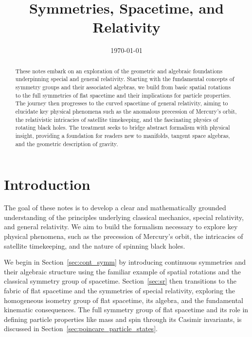 \documentclass{amsart}
\theoremstyle{definition}
\theoremstyle{remark}
\begin{document}
\title{Symmetries, Spacetime, and Relativity}
\author{}
\date{\today}

\begin{abstract}
  These notes embark on an exploration of the geometric and algebraic foundations underpinning special and general relativity. Starting with the fundamental concepts of symmetry groups and their associated algebras, we build from basic spatial rotations to the full symmetries of flat spacetime and their implications for particle properties. The journey then progresses to the curved spacetime of general relativity, aiming to elucidate key physical phenomena such as the anomalous precession of Mercury's orbit, the relativistic intricacies of satellite timekeeping, and the fascinating physics of rotating black holes. The treatment seeks to bridge abstract formalism with physical insight, providing a foundation for readers new to manifolds, tangent space algebras, and the geometric description of gravity.
\end{abstract}

\maketitle

\section{Introduction}
\label{sec:intro}

The goal of these notes is to develop a clear and mathematically grounded understanding of the principles underlying classical mechanics, special relativity, and general relativity. We aim to build the formalism necessary to explore key physical phenomena, such as the precession of Mercury's orbit, the intricacies of satellite timekeeping, and the nature of spinning black holes.

We begin in Section~\ref{sec:cont_symm} by introducing continuous symmetries and their algebraic structure using the familiar example of spatial rotations and the classical symmetry group of spacetime. Section~\ref{sec:sr} then transitions to the fabric of flat spacetime and the symmetries of special relativity, exploring the homogeneous isometry group of flat spacetime, its algebra, and the fundamental kinematic consequences. The full symmetry group of flat spacetime and its role in defining particle properties like mass and spin through its Casimir invariants, is discussed in Section~\ref{sec:poincare_particle_states}.
\end{document}
